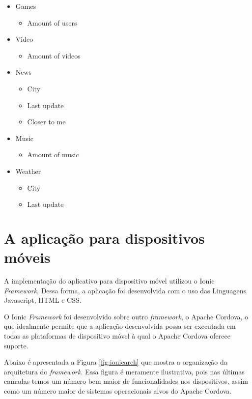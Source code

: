 \begin{footnotesize}
  \begin{itemize}
    \item Games
      \begin{itemize}
        \item Amount of users
      \end{itemize}
    \item Video
      \begin{itemize}
        \item Amount of videos
      \end{itemize}
    \item News
      \begin{itemize}
        \item City
        \item Last update
        \item Closer to me
      \end{itemize}
    \item Music
      \begin{itemize}
        \item Amount of music
      \end{itemize}
    \item Weather
      \begin{itemize}
        \item City
        \item Last update
      \end{itemize}
  \end{itemize}
\end{footnotesize}

\section{A aplicação para dispositivos móveis}
A implementação do aplicativo para dispositivo móvel utilizou o Ionic \textit{Framework}. Dessa forma, a aplicação foi desenvolvida com o uso das Linguagens Javascript, HTML e CSS.

O Ionic \textit{Framework} foi desenvolvido sobre outro \textit{framework}, o Apache Cordova, o que idealmente permite que a aplicação desenvolvida possa ser executada em todas as plataformas de dispositivo móvel à qual o Apache Cordova oferece suporte.

Abaixo é apresentada a Figura \ref{fig:ionicarch} que mostra a organização da arquitetura do \textit{framework}. Essa figura é meramente ilustrativa, pois nas últimas camadas temos um número bem maior de funcionalidades nos dispositivos, assim como um número maior de sistemas operacionais alvos do Apache Cordova.

